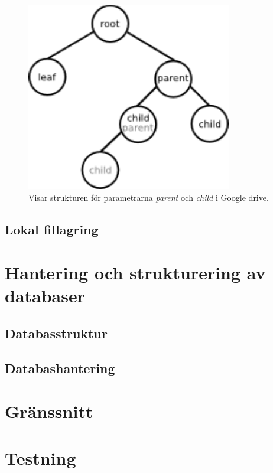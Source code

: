 \documentclass[a4paper,12pt,oneside,final]{extbook}
\begin{document}
\begin{figure}[!H]
\centering
\includegraphics[width=0.8\textwidth]{parentchild.png}
\caption{Visar strukturen för parametrarna \textit{parent} och \textit{child} i Google drive.}
\label{fig:parentchild}
\end{figure}

\subsection{Lokal fillagring}

\section{Hantering och strukturering av databaser}

\subsection{Databasstruktur}
\label{ssec:activerec}

\subsection{Databashantering}

\section{Gränssnitt}

\section{Testning}
\end{document}
